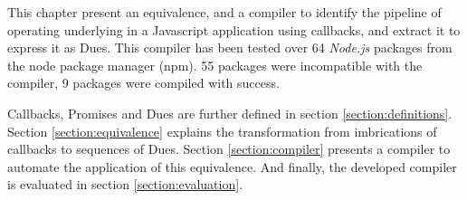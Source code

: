 This chapter present an equivalence, and a compiler to identify the pipeline of operating underlying in a Javascript application using callbacks, and extract it to express it as Dues.
This compiler has been tested over 64 \textit{Node.js} packages from the node package manager (npm).
55 packages were incompatible with the compiler, 9 packages were compiled with success.

Callbacks, Promises and Dues are further defined in section \ref{section:definitions}.
Section \ref{section:equivalence} explains the transformation from imbrications of callbacks to sequences of Dues.
Section \ref{section:compiler} presents a compiler to automate the application of this equivalence.
And finally, the developed compiler is evaluated in section \ref{section:evaluation}.





